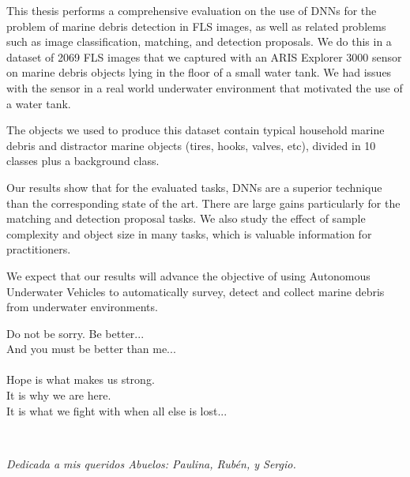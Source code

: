 \documentclass[a4paper, notoc, oneside, openany]{tufte-book} %
\begin{document}
This thesis performs a comprehensive evaluation on the use of DNNs for the problem of marine debris detection in FLS images, as well as related problems such as image classification, matching, and detection proposals. We do this in a dataset of 2069 FLS images that we captured with an ARIS Explorer 3000 sensor on marine debris objects lying in the floor of a small water tank. We had issues with the sensor in a real world underwater environment that motivated the use of a water tank.

The objects we used to produce this dataset contain typical household marine debris and distractor marine objects (tires, hooks, valves, etc), divided in 10 classes plus a background class.

Our results show that for the evaluated tasks, DNNs are a superior technique than the corresponding state of the art. There are large gains particularly for the matching and detection proposal tasks. We also study the effect of sample complexity and object size in many tasks, which is valuable information for practitioners.

We expect that our results will advance the objective of using Autonomous Underwater Vehicles to automatically survey, detect and collect marine debris from underwater environments. 


\newpage
\begin{flushright}
\noindent\fontsize{14}{18}\selectfont
Do not be sorry. Be better...\\ And you must be better than me...\\
\\
\vspace*{1cm}
Hope is what makes us strong.\\ It is why we are here.\\ It is what we fight with when all else is lost...\\
\end{flushright}
~\vfill
\begin{doublespace}
\thispagestyle{empty}
\noindent\fontsize{18}{22}\selectfont\itshape
\nohyphenation
Dedicada a mis queridos Abuelos: Paulina, Rubén, y Sergio.
\end{doublespace}
\vfill
\vfill
\end{document}
